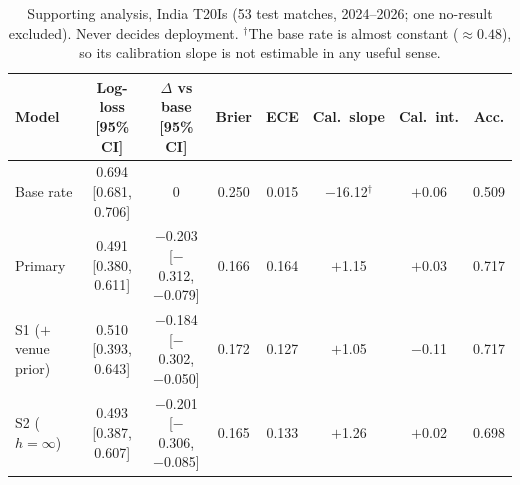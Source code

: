 \begin{table}[t]\centering\footnotesize\setlength{\tabcolsep}{4pt}
\caption{Supporting analysis, India T20Is (53 test matches, 2024--2026; one no-result excluded). Never decides deployment. $^\dagger$The base rate is almost constant ($\approx 0.48$), so its calibration slope is not estimable in any useful sense.}\label{tab:india}
\begin{tabular}{lccccccc}\toprule
Model & Log-loss [95\% CI] & $\Delta$ vs base [95\% CI] & Brier & ECE & Cal.\ slope & Cal.\ int. & Acc.\\\midrule
Base rate & 0.694 [0.681, 0.706] & 0 & 0.250 & 0.015 & $-$16.12$^\dagger$ & $+$0.06 & 0.509\\
Primary & 0.491 [0.380, 0.611] & $-$0.203 [$-$0.312, $-$0.079] & 0.166 & 0.164 & $+$1.15 & $+$0.03 & 0.717\\
S1 ($+$venue prior) & 0.510 [0.393, 0.643] & $-$0.184 [$-$0.302, $-$0.050] & 0.172 & 0.127 & $+$1.05 & $-$0.11 & 0.717\\
S2 ($h=\infty$) & 0.493 [0.387, 0.607] & $-$0.201 [$-$0.306, $-$0.085] & 0.165 & 0.133 & $+$1.26 & $+$0.02 & 0.698\\
\bottomrule\end{tabular}
\end{table}
